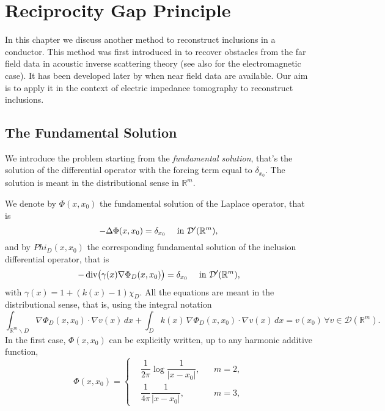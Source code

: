 \documentclass[10pt, a4paper, twoside, openright]{book}
\theoremstyle{definition}
\theoremstyle{plain}
\theoremstyle{plain}
\theoremstyle{plain}
\theoremstyle{plain}
\theoremstyle{plain}
\theoremstyle{plain}
\theoremstyle{plain}
\theoremstyle{plain}
\DeclareMathOperator{\divergence}{div}
\begin{document}
\chapter{Reciprocity Gap Principle}
\label{ch:reciprocity}
In this chapter we discuss another method to reconstruct inclusions in a conductor. 
This method was first introduced in \cite{colton-haddar:rg} to recover obstacles from the far field data in acoustic inverse scattering theory 
(see also \cite{cakoni-mbarek-haddar:electromagnetic} for the electromagnetic case). It has been developed later
by \cite{dicristo-sun:2006, dicristo-sun:2007} when near field data are available. Our aim is to apply it in the context of electric impedance tomography to reconstruct inclusions.
\section{The Fundamental Solution}
\label{subsection:fundamental-solution}
We introduce the problem starting from the \emph{fundamental solution}, that's the solution of 
the differential operator with the forcing term equal to $\delta_{x_0}$.
The solution is meant in the distributional sense in $\mathbb{R}^m$. 
\par
We denote by $\Phi(x,x_0)$ the fundamental solution of the Laplace operator, that is
\begin{equation}
 - \Delta \Phi(x,x_0) = \delta_{x_0} \quad \textup{ in }\mathcal{D}'(\mathbb{R}^m),\label{eq:fundamental-in-dist}
\end{equation}
and by $Phi_D(x, x_0)$ the corresponding fundamental solution of the inclusion differential operator, that is
\begin{equation}
 - \divergence\bigl(\gamma(x)\nabla \Phi_D(x,x_0)\bigr) = \delta_{x_0}\quad\textup{ in }\mathcal{D}'(\mathbb{R}^m), \label{eq:fundamental-D-in-dist}
\end{equation}
with $\gamma(x) = 1+(k(x)-1)\chi_D$. 
All the equations are meant in the distributional sense, that is, using the integral notation
\begin{equation}
 \int_{\mathbb{R}^m \backslash D}\nabla \Phi_D(x,x_0) \cdot \nabla v(x) \, dx + \int_{D} k(x) \, \nabla \Phi_D(x,x_0) \cdot \nabla v(x) \, dx = v(x_0) \, \forall v \in \mathcal{D}(\mathbb{R}^m).
\end{equation}
In the first case, $\Phi(x,x_0)$ can be explicitly written, up to any harmonic additive function,
\begin{equation}
\label{eq:definition-Phi-23}
  \Phi(x,x_0)=
  \left\{
  \begin{aligned}
   &\dfrac{1}{2\pi}\log\dfrac{1}{| x - x_0|}, && m=2, \\
   &\dfrac{1}{4\pi}\dfrac{1}{| x  - x_0|}, && m=3, 
  \end{aligned}
  \right.
\end{equation}
\end{document}
